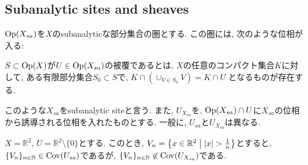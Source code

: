 \documentclass[../main]{subfiles}
\begin{document}
\setcounter{section}{2}
\setcounter{subsection}{2} \addtocounter{subsection}{-1}
\subsection{Subanalytic sites and sheaves}
\begin{dfn}
  $\mathrm{Op}(X_{sa})$を$X$のsubanalyticな部分集合の圏とする.
  この圏には, 次のような位相が入る:

  $S\subset\mathrm{Op}(X)$が$U\in\mathrm{Op}(X_{sa})$の被覆であるとは,
  $X$の任意のコンパクト集合$K$に対して,
  ある有限部分集合$S_0\subset S$で,
  $K\cap (\cup_{V\in S_0} V) = K\cap U$
  となるものが存在する.

  このような$X_{sa}$をsubanalytic siteと言う.
  また, $U_{X_{sa}}$を,
  $\mathrm{Op}(X_{sa})\cap U$に$X_{sa}$の位相から誘導される位相を入れたものとする.
  一般に, $U_{sa}$と$U_{X_{sa}}$は異なる.
\end{dfn}

\begin{eg}
  $X = \mathbb{R}^2$, $U = \mathbb{R}^2\setminus\{0\}$とする.
  このとき, $V_n = \left\{ x\in\mathbb{R}^2 \relmiddle{|} |x|>\frac{1}{n} \right\}$とすると,
  $\{V_n\}_{n\in\mathbb{N}}\in\mathrm{Cov}(U_{sa})$であるが,
  $\{V_n\}_{n\in\mathbb{N}}\not\in\mathrm{Cov}(U_{X_{sa}})$である.
\end{eg}
\end{document}
